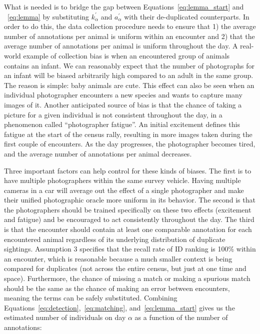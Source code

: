 \noindent What is needed is to bridge the gap between Equations~\eqref{eq:lemma_start} and ~\eqref{eq:lemma} by substituting $k^{\prime}_{\alpha}$ and $a^{\prime}_{\alpha}$ with their de-duplicated counterparts.  In order to do this, the data collection procedure needs to ensure that 1) the average number of annotations per animal is uniform within an encounter and 2) that the average number of annotations per animal is uniform throughout the day.  A real-world example of collection bias is when an encountered group of animals contains an infant.  We can reasonably expect that the number of photographs for an infant will be biased arbitrarily high compared to an adult in the same group.  The reason is simple: baby animals are cute.  This effect can also be seen when an individual photographer encounters a new species and wants to capture many images of it.  Another anticipated source of bias is that the chance of taking a picture for a given individual is not consistent throughout the day, in a phenomenon called ``photographer fatigue''.  An initial excitement defines this fatigue at the start of the census rally, resulting in more images taken during the first couple of encounters.  As the day progresses, the photographer becomes tired, and the average number of annotations per animal decreases.

Three important factors can help control for these kinds of biases.  The first is to have multiple photographers within the same survey vehicle.  Having multiple cameras in a car will average out the effect of a single photographer and make their unified photographic oracle more uniform in its behavior.  The second is that the photographers should be trained specifically on these two effects (excitement and fatigue) and be encouraged to act consistently throughout the day.  The third is that the encounter should contain at least one comparable annotation for each encountered animal regardless of its underlying distribution of duplicate sightings.  Assumption 3 specifies that the recall rate of ID ranking is 100\% within an encounter, which is reasonable because a much smaller context is being compared for duplicates (not across the entire census, but just at one time and space). Furthermore, the chance of missing a match or making a spurious match should be the same as the chance of making an error between encounters,  meaning the terms can be safely substituted.  Combining Equations~\eqref{eq:detection},~\eqref{eq:matching}, and~\eqref{eq:lemma_start} gives us the estimated number of individuals on day $\alpha$ as a function of the number of annotations:

